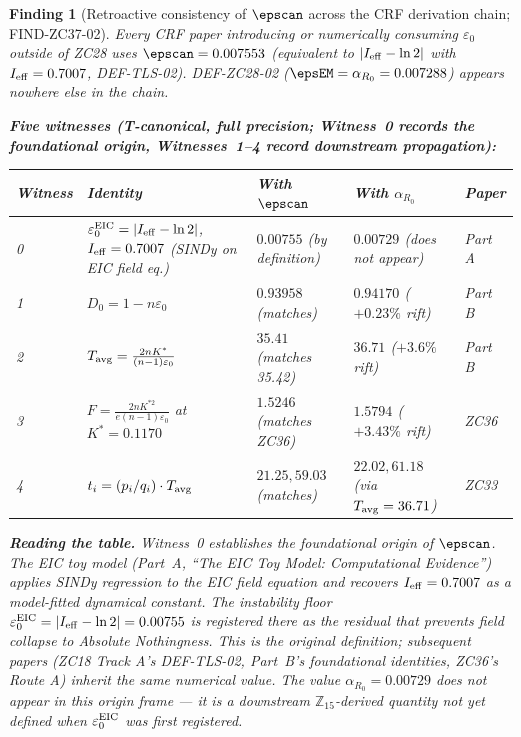 \documentclass[12pt, a4paper]{article}
\newtheorem{finding}{Finding}[section]
\begin{document}
\begin{finding}[Retroactive consistency of $\epscan$ across
  the CRF derivation chain; FIND-ZC37-02]
\label{find:retro-consistency}
Every CRF paper introducing or numerically consuming
$\varepsilon_0$ outside of ZC28 uses $\epscan = 0.007553$
(equivalent to $|I_{\rm eff} - \ln 2|$ with $I_{\rm eff} = 0.7007$,
DEF-TLS-02). DEF-ZC28-02 ($\epsEM = \alpha_{R_0} = 0.007288$)
appears nowhere else in the chain.

\medskip
\textbf{Five witnesses (T-canonical, full precision; Witness~0
records the foundational origin, Witnesses~1--4 record
downstream propagation):}

\begin{center}
{\small
\renewcommand{\arraystretch}{1.32}
\begin{tabular}{p{2.0cm}p{4.0cm}p{2.4cm}p{2.4cm}p{1.8cm}}
\toprule
\textbf{Witness} & \textbf{Identity} &
  \textbf{With $\epscan$} & \textbf{With $\alpha_{R_0}$} &
  \textbf{Paper} \\
\midrule
0 & $\varepsilon_0^{\rm EIC} = |I_{\rm eff} - \ln 2|$,
  $I_{\rm eff} = 0.7007$ (SINDy on EIC field eq.) &
  $0.00755$ \emph{(by definition)} &
  $0.00729$ \emph{(does not appear)} &
  Part A \\
1 & $D_0 = 1 - n\varepsilon_0$ &
  $0.93958$ \emph{(matches)} & $0.94170$ \emph{($+0.23\%$ rift)} &
  Part B \\
2 & $T_{\rm avg} = \frac{2nK^*}{(n-1)\varepsilon_0}$ &
  $35.41$ \emph{(matches 35.42)} & $36.71$ \emph{($+3.6\%$ rift)} &
  Part B \\
3 & $F = \frac{2nK^{*2}}{e(n-1)\varepsilon_0}$ at $K^* = 0.1170$ &
  $1.5246$ \emph{(matches ZC36)} & $1.5794$ \emph{($+3.43\%$ rift)} &
  ZC36 \\
4 & $t_i = (p_i/q_i)\cdot T_{\rm avg}$ &
  $21.25, 59.03$ \emph{(matches)} & $22.02, 61.18$ \emph{(via $T_{\rm avg} = 36.71$)} &
  ZC33 \\
\bottomrule
\end{tabular}
}
\end{center}

\medskip
\textbf{Reading the table.} Witness~0 establishes the
\emph{foundational origin} of $\epscan$. The EIC toy model
(Part~A, ``The EIC Toy Model: Computational Evidence'')
applies SINDy regression to the EIC field equation and
recovers $I_{\rm eff} = 0.7007$ as a model-fitted dynamical
constant. The instability floor
$\varepsilon_0^{\rm EIC} = |I_{\rm eff} - \ln 2| = 0.00755$
is registered there as the residual that prevents field
collapse to Absolute Nothingness. This is the original
definition; subsequent papers (ZC18 Track A's DEF-TLS-02,
Part~B's foundational identities, ZC36's Route A) inherit
the same numerical value. The value $\alpha_{R_0} = 0.00729$
does not appear in this origin frame --- it is a downstream
$\mathbb{Z}_{15}$-derived quantity not yet defined when
$\varepsilon_0^{\rm EIC}$ was first registered.


\end{finding}
\end{document}
